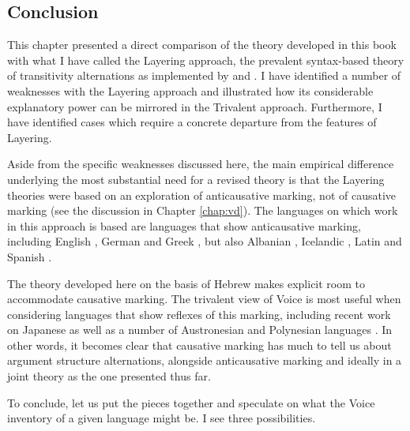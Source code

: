 \begin{exe}
\begin{xlist}
\begin{exe}
\begin{exe}
\begin{xlist}
\begin{exe}
\begin{exe}
\begin{exe}
\begin{exe}
\begin{exe}
\begin{xlist}
\begin{exe}
\begin{exe}
\begin{xlist}
\begin{exe}
\begin{xlist}
\begin{exe}
\begin{xlist}
\begin{exe}
\begin{xlist}
\section{Conclusion} \label{aas:conc}
This chapter presented a direct comparison of the theory developed in this book with what I have called the Layering approach, the prevalent syntax-based theory of transitivity alternations as implemented by \cite{schaefer08,schaefer17oup} and \cite{layering15}. I have identified a number of weaknesses with the Layering approach and illustrated how its considerable explanatory power can be mirrored in the Trivalent approach. Furthermore, I have identified cases which require a concrete departure from the features of Layering.

Aside from the specific weaknesses discussed here, the main empirical difference underlying the most substantial need for a revised theory is that the Layering theories were based on an exploration of anticausative marking, not of causative marking (see the discussion in Chapter \ref{chap:vd}). The languages on which work in this approach is based are languages that show anticausative marking, including English \citep{myler16mit}, German \citep{schaefer17oup} and Greek \citep{spathasetal15}, but also Albanian \citep{kallulli13}, Icelandic \citep{wood15springer}, Latin \citep{embick04,kastnerzu17} and Spanish \citep{schaefervivanco16}.

The theory developed here on the basis of Hebrew makes explicit room to accommodate causative marking. The trivalent view of Voice is most useful when considering languages that show reflexes of this marking, including recent work on Japanese \citep{oseki17nyu} as well as a number of Austronesian and Polynesian languages \citep{nie17}. In other words, it becomes clear that causative marking has much to tell us about argument structure alternations, alongside anticausative marking and ideally in a joint theory as the one presented thus far.

To conclude, let us put the pieces together and speculate on what the Voice inventory of a given language might be. I see three possibilities.


\end{xlist}
\end{exe}
\end{xlist}
\end{exe}
\end{xlist}
\end{exe}
\end{xlist}
\end{exe}
\end{exe}
\end{xlist}
\end{exe}
\end{exe}
\end{exe}
\end{exe}
\end{exe}
\end{xlist}
\end{exe}
\end{exe}
\end{xlist}
\end{exe}
